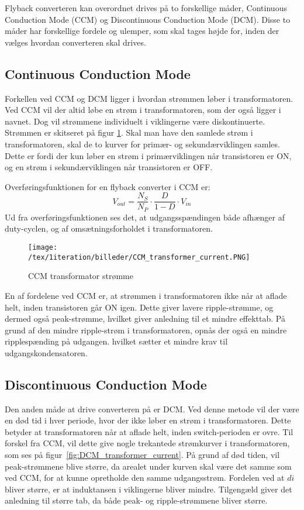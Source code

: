 Flyback converteren kan overordnet drives på to forskellige måder, Continuous Conduction Mode (CCM) og Discontinuous Conduction Mode (DCM). Disse to måder har forskellige fordele og ulemper, som skal tages højde for, inden der vælges hvordan converteren skal drives. 

\subsection{Continuous Conduction Mode}
Forkellen ved CCM og DCM ligger i hvordan strømmen løber i transformatoren. Ved CCM vil der altid løbe en strøm i transformatoren, som der også ligger i navnet. Dog vil strømmene individuelt i viklingerne være diskontinuerte. Strømmen er skitseret på figur \ref{fig:CCM_transformer_current}. Skal man have den samlede strøm i transformatoren, skal de to kurver for primær- og sekundærviklingen samles. Dette er fordi der kun løber en strøm i primærviklingen når transistoren er ON, og en strøm i sekundærviklingen når transistoren er OFF. 

\noindent Overføringsfunktionen for en flyback converter i CCM er\cite{SMPS-topologies2}:
\begin{equation} \label{flyback_converter_CCM_overforinsfunktion}
V_{out} = \frac{N_S}{N_P} \cdot \frac{D}{1-D} \cdot V_{in}
\end{equation}
Ud fra overføringsfunktionen ses det, at udgangsspændingen både afhænger af duty-cyclen, og af omsætningsforholdet i transformatoren. 

\begin{figure}[H]
	\center
	\texttt{[image: /tex/1iteration/billeder/CCM\_transformer\_current.PNG]}
	\caption{CCM transformator strømme}
	\label{fig:CCM_transformer_current}
\end{figure}

\noindent En af fordelene ved CCM er, at strømmen i transformatoren ikke når at aflade helt, inden transistoren går ON igen. Dette giver lavere ripple-strømme, og dermed også peak-strømme, hvilket giver anledning til et mindre effekttab. På grund af den mindre ripple-strøm i transformatoren, opnås der også en mindre ripplespænding på udgangen. hvilket sætter et mindre krav til udgangskondensatoren. 

\subsection{Discontinuous Conduction Mode}
Den anden måde at drive converteren på er DCM. Ved denne metode vil der være en død tid i hver periode, hvor der ikke løber en strøm i transformatoren. Dette betyder at transformatoren når at aflade helt, inden switch-perioden er ovre. Til forskel fra CCM, vil dette give nogle trekantede strømkurver i transformatoren, som ses på figur~\ref{fig:DCM_transformer_current}.
På grund af død tiden, vil peak-strømmene blive større, da arealet under kurven skal være det samme som ved CCM, for at kunne opretholde den samme udgangsstrøm. 
Fordelen ved at $di$ bliver større, er at induktansen i viklingerne bliver mindre. Tilgengæld giver det anledning til større tab, da både peak- og ripple-strømmene bliver større.

